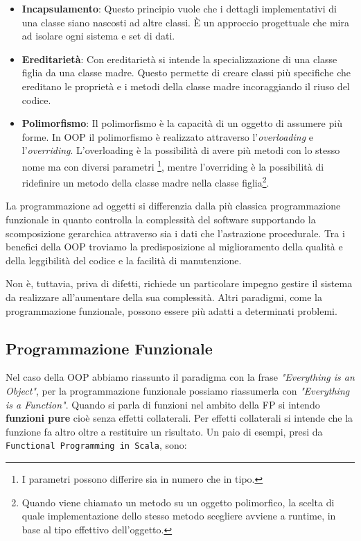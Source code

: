 \documentclass[12pt,a4paper,openright,twoside]{book}
\begin{document}
\begin{itemize}
    \item \textbf{Incapsulamento}: Questo principio vuole che i dettagli implementativi di una classe siano nascosti ad altre classi. È un approccio progettuale che mira ad isolare ogni sistema e set di dati. 
    \item \textbf{Ereditarietà}: Con ereditarietà si intende la specializzazione di una classe figlia da una classe madre. Questo permette di creare classi più specifiche che ereditano le proprietà e i metodi della classe madre incoraggiando il riuso del codice.
    \item \textbf{Polimorfismo}: Il polimorfismo è la capacità di un oggetto di assumere più forme. In OOP il polimorfismo è realizzato attraverso l'\textit{overloading} e l'\textit{overriding}. L'overloading è la possibilità di avere più metodi con lo stesso nome ma con diversi parametri \footnote{I parametri possono differire sia in numero che in tipo.}, mentre l'overriding è la possibilità di ridefinire un metodo della classe madre nella classe figlia\footnote{Quando viene chiamato un metodo su un oggetto polimorfico, la scelta di quale implementazione dello stesso metodo scegliere avviene a runtime, in base al tipo effettivo dell'oggetto.}.
\end{itemize}

La programmazione ad oggetti si differenzia dalla più classica programmazione funzionale in quanto controlla la complessità del software supportando la scomposizione gerarchica attraverso sia i dati che l'astrazione procedurale.
Tra i benefici della OOP troviamo la predisposizione al miglioramento della qualità e della leggibilità del codice e la facilità di manutenzione.

Non è, tuttavia, priva di difetti, richiede un particolare impegno gestire il sistema da realizzare all'aumentare della sua complessità. Altri paradigmi, come la programmazione funzionale, possono essere più adatti a determinati problemi.

\subsection{Programmazione Funzionale}
Nel caso della OOP abbiamo riassunto il paradigma con la frase \textit{"Everything is an Object"}, per la programmazione funzionale possiamo riassumerla con \textit{"Everything is a Function"}. Quando si parla di funzioni nel ambito della \ac{FP} si intendo \textbf{funzioni pure} cioè senza effetti collaterali. Per effetti collaterali si intende che la funzione fa altro oltre a restituire un risultato. Un paio di esempi, presi da \texttt{Functional Programming in Scala}, sono:
\end{document}
